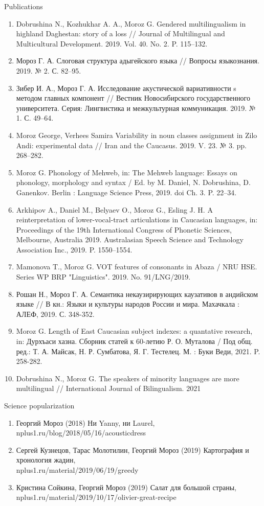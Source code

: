 \documentclass{resume} %
\begin{document}
\begin{rSection}{Publications}
\begin{enumerate}
\item  Dobrushina N., Kozhukhar A. A., Moroz G. Gendered multilingualism in highland Daghestan: story of a loss // Journal of Multilingual and Multicultural Development. 2019. Vol. 40. No. 2. P. 115--132.
\item Мороз Г. А. Слоговая структура адыгейского языка // Вопросы языкознания. 2019. № 2. С. 82--95.
\item  Зибер И. А., Мороз Г. А. Исследование акустической вариативности s методом главных компонент // Вестник Новосибирского государственного университета. Серия: Лингвистика и межкультурная коммуникация. 2019. № 1. С. 49--64.
\item Moroz George, Verhees Samira Variability in noun classes assignment in Zilo Andi: experimental data // Iran and the Caucasus. 2019. V. 23. № 3. pp. 268--282.
\item  Moroz G. Phonology of Mehweb, in: The Mehweb language: Essays on phonology, morphology and syntax / Ed. by M. Daniel, N. Dobrushina, D. Ganenkov. Berlin : Language Science Press, 2019. doi Ch. 3. P. 22--34.
\item Arkhipov A., Daniel M., Belyaev O., Moroz G., Esling J. H. A reinterpretation of lower-vocal-tract articulations in Caucasian languages, in: Proceedings of the 19th International Congress of Phonetic Sciences, Melbourne, Australia 2019. Australasian Speech Science and Technology Association Inc., 2019. P. 1550--1554.
\item Mamonova T., Moroz G. VOT features of consonants in Abaza / NRU HSE. Series WP BRP "Linguistics". 2019. No. 91/LNG/2019.
\item Рошан Н., Мороз Г. А. Семантика некаузирирующих каузативов в андийском языке // В кн.: Языки и культуры народов России и мира. Махачкала : АЛЕФ, 2019. С. 348-352.
\item Moroz G. Length of East Caucasian subject indexes: a quantative research, in: Дурхъаси хазна. Сборник статей к 60-летию Р. О. Муталова / Под общ. ред.: Т. А. Майсак, Н. Р. Сумбатова, Я. Г. Тестелец. М. : Буки Веди, 2021. P. 258-282.
\item Dobrushina N., Moroz G. The speakers of minority languages are more multilingual // International Journal of Bilingualism. 2021
\end{enumerate}
\end{rSection}

\begin{rSection}{Science popularization}
\begin{enumerate}
\item Георгий Мороз (2018)  Ни Yanny, ни Laurel, \\ nplus1.ru/blog/2018/05/16/acousticdress
\item Сергей Кузнецов, Тарас Молотилин, Георгий Мороз (2019) Картография и хронология жадин, \\ nplus1.ru/material/2019/06/19/greedy
\item Кристина Сойкина, Георгий Мороз (2019) Салат для большой страны, \\ nplus1.ru/material/2019/10/17/olivier-great-recipe
\end{enumerate}
\end{rSection}
\end{document}
